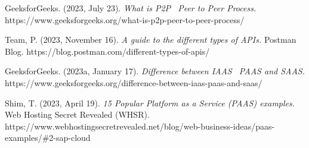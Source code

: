 \documentclass[spanish]{article}
\begin{document}
\begin{thebibliography}{X}
\item GeeksforGeeks. (2023, July 23). \textit{What is P2P 
Peer to Peer Process.} https://www.geeksforgeeks.org/what-is-p2p-peer-to-peer-process/

\item Team, P. (2023, November 16). \textit{A guide to the
different types of APIs.} Postman Blog. https://blog.postman.com/different-types-of-apis/

\item GeeksforGeeks. (2023a, January 17). \textit{Difference
between IAAS  PAAS and SAAS.} https://www.geeksforgeeks.org/difference-between-iaas-paas-and-saas/

\item Shim, T. (2023, April 19). \textit{15 Popular Platform as a
Service (PAAS) examples.} Web Hosting Secret Revealed (WHSR).
https://www.webhostingsecretrevealed.net/blog/web-business-ideas/paas-examples/\#2-sap-cloud 
\end{thebibliography}
\end{document}
